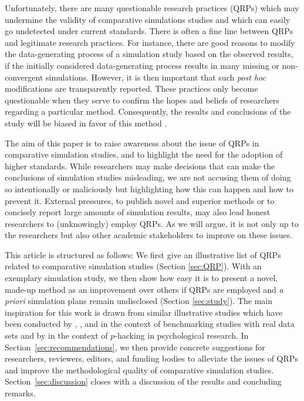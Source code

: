 \documentclass[a4paper, 11pt]{article}
\begin{document}
Unfortunately, there are many questionable research practices (QRPs) which may
undermine the validity of comparative simulations studies and which can easily
go undetected under current standards. There is often a fine line between QRPs and
legitimate research practices. For instance, there are good reasons to modify the data-generating 
process of a simulation study based on the observed results, \eg{} if the initially 
considered data-generating process results in many missing or non-convergent simulations.
However, it is then important that such \emph{post hoc} modifications are transparently
reported. These practices only become questionable when they serve to confirm the hopes 
and beliefs of researchers regarding a particular method. Consequently, the results and 
conclusions of the study will be biased in favor of this method \citep{Niessl2021}.

The aim of this paper is to raise awareness about the issue of QRPs in comparative
simulation studies, and to highlight the need for the adoption of higher standards. 
While researchers may make decisions that can make the conclusions of simulation
studies misleading, we are not accusing them of doing so intentionally or
maliciously but highlighting how this can happen and how to prevent it.
External pressures, \eg{} to publish novel and superior methods \citep{Boulesteix2015}
or to concisely report large amounts of simulation results, may also lead honest researchers
to (unknowingly) employ QRPs. As we will argue, it is not only up to the researchers but
also other academic stakeholders to improve on these issues. 

This article is structured as follows: We first give an illustrative list of QRPs
related to comparative simulation studies (Section \ref{sec:QRP}). With an
exemplary simulation study, we then show how easy it is to present a novel,
made-up method as an improvement over others if QRPs are employed and 
\emph{a priori} simulation plans remain undisclosed (Section \ref{sec:study}).
The main inspiration for this work is drawn from similar illustrative studies which have
been conducted by \citet{Jelizarow2010}, \citet{Niessl2021}, and \citet{Ullmann2022}
in the context of benchmarking studies with real data sets and by
\citet{Simmons2011} in the context of $p$-hacking in psychological research.
In Section~\ref{sec:recommendations}, we then provide concrete suggestions for
researchers, reviewers, editors, and funding bodies to alleviate the issues of
QRPs and improve the methodological quality of comparative simulation studies.
Section~\ref{sec:discussion} closes with a discussion of the results and 
concluding remarks.
\end{document}

